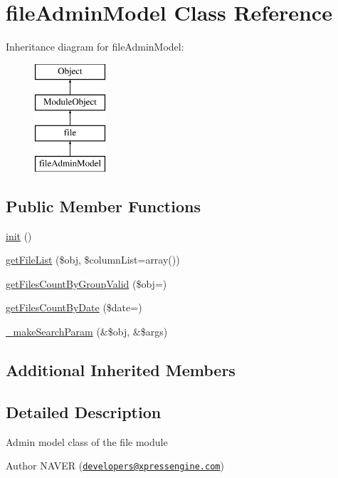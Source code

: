 \hypertarget{classfileAdminModel}{}\section{file\+Admin\+Model Class Reference}
\label{classfileAdminModel}
Inheritance diagram for file\+Admin\+Model\+:\begin{figure}[H]
\begin{center}
\leavevmode
\includegraphics[height=4.000000cm]{classfileAdminModel}
\end{center}
\end{figure}
\subsection*{Public Member Functions}
\begin{DoxyCompactItemize}
\item 
\hyperlink{classfileAdminModel_a043ae7934f6fb3bb6ef24bff36a63795}{init} ()
\item 
\hyperlink{classfileAdminModel_a19433395ef400eaf33876d93db918a29}{get\+File\+List} (\$obj, \$column\+List=array())
\item 
\hyperlink{classfileAdminModel_aae3d004799fc86f576b61d96424fb1fa}{get\+Files\+Count\+By\+Group\+Valid} (\$obj=\textquotesingle{}\textquotesingle{})
\item 
\hyperlink{classfileAdminModel_adc27c16ce50a46d35e2c95f1ccc87147}{get\+Files\+Count\+By\+Date} (\$date=\textquotesingle{}\textquotesingle{})
\item 
\hyperlink{classfileAdminModel_a2da869c66512ff677a71674030c8637c}{\+\_\+make\+Search\+Param} (\&\$obj, \&\$args)
\end{DoxyCompactItemize}
\subsection*{Additional Inherited Members}


\subsection{Detailed Description}
Admin model class of the file module \begin{DoxyAuthor}{Author}
N\+A\+V\+ER (\href{mailto:developers@xpressengine.com}{\tt developers@xpressengine.\+com}) 
\end{DoxyAuthor}


